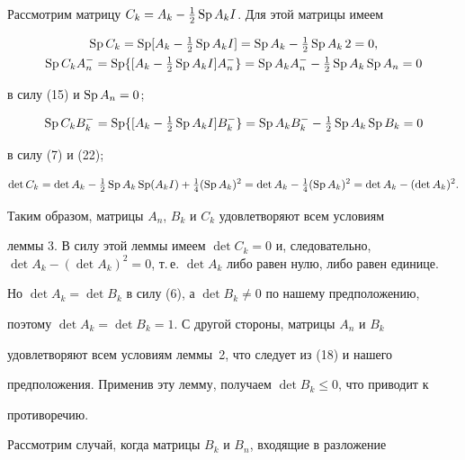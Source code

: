  


Рассмотрим матрицу $C_k=A_k-\frac{1}{2}\operatorname{Sp} A_k I$. Для этой матрицы имеем 


\begin{gather*} 


\Sp C_k=\Sp[A_k-\tfrac{1}{2}\Sp A_k I]=\Sp A_k-\tfrac{1}{2} 


\Sp A_k\,2=0,\\ 


\Sp C_k A^-_n=\Sp\{[A_k-\tfrac{1}{2}\Sp A_k I]A^-_n\}=\Sp A_k A^-_n 


-\tfrac{1}{2}\Sp A_k\Sp A_n=0 


\end{gather*} 


в силу (15) и $\operatorname{Sp} A_n=0$; 


$$ 


\Sp C_k B^-_k=\Sp\{[A_k-\tfrac{1}{2}\Sp A_k I]B^-_k\} 


=\Sp A_k B^-_k-\tfrac{1}{2}\Sp A_k\Sp B_k=0 


$$ 


в силу (7) и (22); 


$$ 


\det C_k=\det A_k-\tfrac{1}{2}\Sp A_k\Sp(A_k I)+\tfrac{1}{4} 


(\Sp A_k)^2=\det A_k-\tfrac{1}{4}(\Sp A_k)^2=\det A_k- 


(\det A_k)^2. 


$$ 


 


Таким образом, матрицы $A_n$, $B_k$ и $C_k$ удовлетворяют всем условиям 


леммы 3. В силу этой леммы имеем $\det C_k=0$ и, следовательно, $\det 


A_k-(\det A_k)^2=0$, т.\,е. $\det A_k$ либо равен нулю, либо равен единице. 


Но $\det A_k=\det B_k$ в силу (6), а $\det B_k\ne0$ по нашему предположению, 


поэтому $\det A_k=\det B_k=1$. С другой стороны, матрицы $A_n$ и $B_k$ 


удовлетворяют всем условиям леммы~2, что следует из (18) и нашего 


предположения. Применив эту лемму, получаем $\det B_k\le0$, что приводит к 


противоречию. 


 


Рассмотрим случай, когда матрицы $B_k$ и $B_n$, входящие в разложение 


